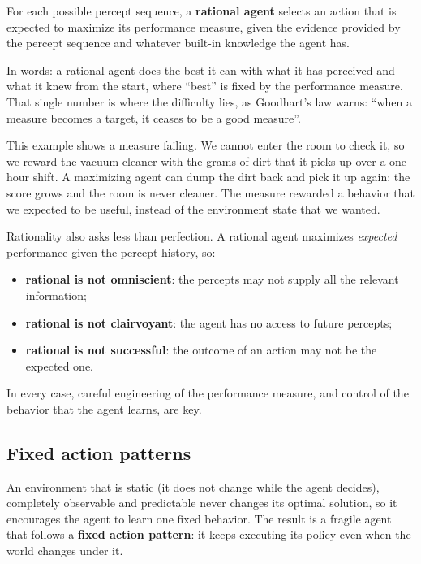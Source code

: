 \begin{definition}\label{def:rational-agent}
  For each possible percept sequence, a \textbf{rational agent} selects an
  action that is expected to maximize its performance measure, given the
  evidence provided by the percept sequence and whatever built-in knowledge the
  agent has.
\end{definition}

In words: a rational agent does the best it can with what it has perceived and
what it knew from the start, where ``best'' is fixed by the performance
measure. That single number is where the difficulty lies, as Goodhart's law
warns:
``when a measure becomes a target, it ceases to be a good measure''.

\begin{example}\label{ex:goodhart-vacuum}
  This example shows a measure failing. We cannot enter the room to check it,
  so we reward the vacuum cleaner with the grams of dirt that it picks up over
  a one-hour shift. A maximizing agent can dump the dirt back and pick it up
  again: the score grows and the room is never cleaner. The measure rewarded a
  behavior that we expected to be useful, instead of the environment state that
  we wanted.
\end{example}

Rationality also asks less than perfection. A rational agent maximizes
\emph{expected} performance given the percept history, so:
\begin{itemize}
  \item \textbf{rational is not omniscient}: the percepts may not supply all
    the relevant information;
  \item \textbf{rational is not clairvoyant}: the agent has no access to future
    percepts;
  \item \textbf{rational is not successful}: the outcome of an action may not be
    the expected one.
\end{itemize}
In every case, careful engineering of the performance measure, and control of
the behavior that the agent learns, are key.

\subsection{Fixed action patterns}\label{sec:agents-fixed-patterns}

An environment that is static (it does not change while the agent decides),
completely observable and predictable never changes its optimal solution, so it
encourages the agent to learn one fixed behavior. The
result is a fragile agent that follows a \textbf{fixed action pattern}: it
keeps executing its policy even when the world changes under it.

